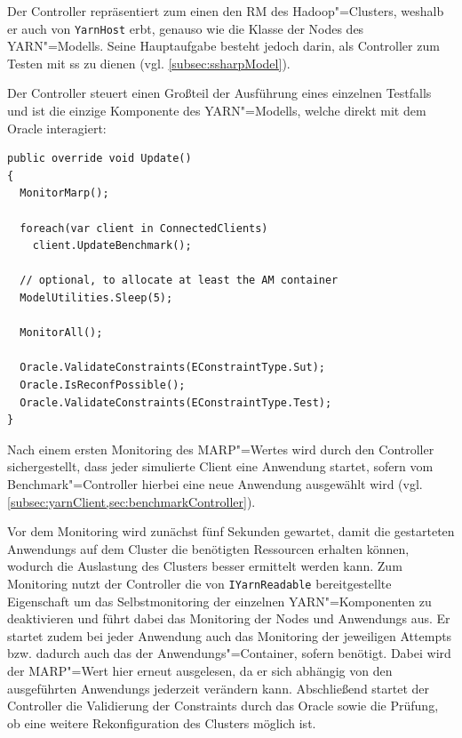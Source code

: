 Der Controller repräsentiert zum einen den \gls{RM} des Hadoop"=Clusters, weshalb er auch von \texttt{YarnHost} erbt, genauso wie die Klasse der Nodes des \gls{YARN}"=Modells.
Seine Hauptaufgabe besteht jedoch darin, als Controller zum Testen mit \gls{ss} zu dienen (vgl. \cref{subsec:ssharpModel}).

Der Controller steuert einen Großteil der Ausführung eines einzelnen Testfalls und ist die einzige Komponente des \gls{YARN}"=Modells, welche direkt mit dem Oracle interagiert:

\begin{lstlisting}[label=lst:controllerUpdate,style=cs,
caption={[Update()"=Methode des Controllers]
    \texttt{Update()}"=Methode des Controllers (gekürzt).
    Eine ausführliche Beschreibung des Ablaufs der Ausführung eines Testfalls findet sich in \cref{subsec:simulationStep}.}]
public override void Update()
{
  MonitorMarp();
  
  foreach(var client in ConnectedClients)
    client.UpdateBenchmark();
  
  // optional, to allocate at least the AM container
  ModelUtilities.Sleep(5);
  
  MonitorAll();
  
  Oracle.ValidateConstraints(EConstraintType.Sut);
  Oracle.IsReconfPossible();
  Oracle.ValidateConstraints(EConstraintType.Test);
}
\end{lstlisting}

Nach einem ersten Monitoring des \gls{MARP}"=Wertes wird durch den Controller sichergestellt, dass jeder simulierte Client eine \gls{Anwendung} startet, sofern vom Benchmark"=Controller hierbei eine neue \gls{Anwendung} ausgewählt wird (vgl. \cref{subsec:yarnClient,sec:benchmarkController}).

Vor dem Monitoring wird zunächst fünf Sekunden gewartet, damit die gestarteten \glspl{Anwendung} auf dem Cluster die benötigten Ressourcen erhalten können, wodurch die Auslastung des Clusters besser ermittelt werden kann.
Zum Monitoring nutzt der Controller die von \texttt{IYarnReadable} bereitgestellte Eigenschaft um das Selbstmonitoring der einzelnen \gls{YARN}"=Komponenten zu deaktivieren und führt dabei das Monitoring der Nodes und \glspl{Anwendung} aus.
Er startet zudem bei jeder \gls{Anwendung} auch das Monitoring der jeweiligen \glspl{Attempt} bzw. dadurch auch das der Anwendungs"=Container, sofern benötigt.
Dabei wird der \gls{MARP}"=Wert hier erneut ausgelesen, da er sich abhängig von den ausgeführten \glspl{Anwendung} jederzeit verändern kann.
Abschließend startet der Controller die Validierung der Constraints durch das Oracle sowie die Prüfung, ob eine weitere Rekonfiguration des Clusters möglich ist.

